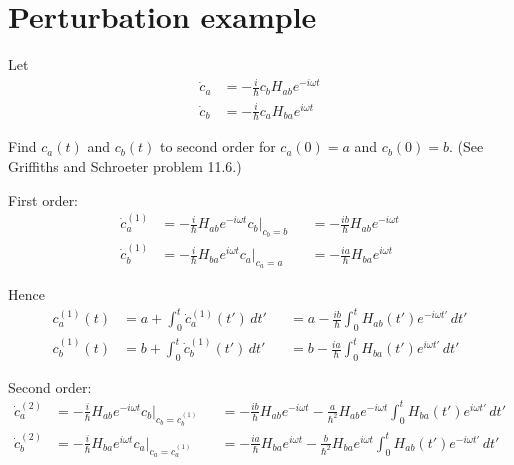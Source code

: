 

\section*{Perturbation example}

Let
\begin{equation*}
\begin{aligned}
\dot c_a&=-\frac{i}{\hbar}c_bH_{ab}e^{-i\omega t}
\\
\dot c_b&=-\frac{i}{\hbar}c_aH_{ba}e^{i\omega t}
\end{aligned}
\end{equation*}

Find $c_a(t)$ and $c_b(t)$ to second order for $c_a(0)=a$ and $c_b(0)=b$.
(See Griffiths and Schroeter problem 11.6.)

\bigskip
First order:
\begin{equation*}
\begin{aligned}
\dot c_a^{(1)}&=-\frac{i}{\hbar}H_{ab}e^{-i\omega t}c_b\bigg|_{c_b=b}
&&=-\frac{ib}{\hbar}H_{ab}e^{-i\omega t}
\\
\dot c_b^{(1)}&=-\frac{i}{\hbar}H_{ba}e^{i\omega t}c_a\bigg|_{c_a=a}
&&=-\frac{ia}{\hbar}H_{ba}e^{i\omega t}
\end{aligned}
\tag{1}
\end{equation*}

Hence
\begin{equation*}
\begin{aligned}
c_a^{(1)}(t)&=a+\int_0^t\dot c_a^{(1)}(t')\,dt'
&&=a-\frac{ib}{\hbar}\int_0^tH_{ab}(t')e^{-i\omega t'}\,dt'
\\
c_b^{(1)}(t)&=b+\int_0^t\dot c_b^{(1)}(t')\,dt'
&&=b-\frac{ia}{\hbar}\int_0^tH_{ba}(t')e^{i\omega t'}\,dt'
\end{aligned}
\tag{2}
\end{equation*}

Second order:
\begin{equation*}
\begin{aligned}
\dot c_a^{(2)}&=-\frac{i}{\hbar}H_{ab}e^{-i\omega t}c_b\bigg|_{c_b=c_b^{(1)}}
&&=-\frac{ib}{\hbar}H_{ab}e^{-i\omega t}-\frac{a}{\hbar^2}H_{ab}e^{-i\omega t}
\int_0^tH_{ba}(t')e^{i\omega t'}\,dt'
\\
\dot c_b^{(2)}&=-\frac{i}{\hbar}H_{ba}e^{i\omega t}c_a\bigg|_{c_a=c_a^{(1)}}
&&=-\frac{ia}{\hbar}H_{ba}e^{i\omega t}-\frac{b}{\hbar^2}H_{ba}e^{i\omega t}
\int_0^tH_{ab}(t')e^{-i\omega t'}\,dt'
\end{aligned}
\tag{3}
\end{equation*}


